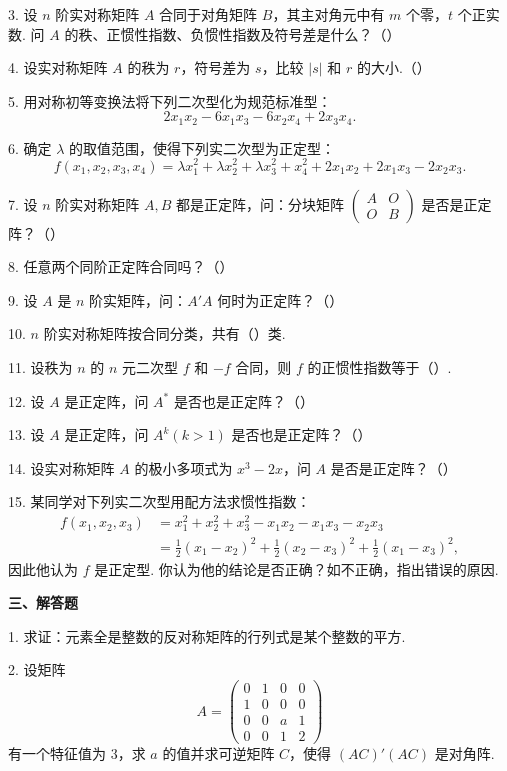 \documentclass[UTF8,12pt,a4paper,fontset=fandol]{ctexart}
\begin{document}
3. 设 $n$ 阶实对称矩阵 $A$ 合同于对角矩阵 $B$，其主对角元中有 $m$ 个零，$t$ 个正实数. 问 $A$ 的秩、正惯性指数、负惯性指数及符号差是什么？（\quad ）

4. 设实对称矩阵 $A$ 的秩为 $r$，符号差为 $s$，比较 $|s|$ 和 $r$ 的大小.（\quad ）

5. 用对称初等变换法将下列二次型化为规范标准型：
\[
2x_1x_2-6x_1x_3-6x_2x_4+2x_3x_4.
\]

6. 确定 $\lambda$ 的取值范围，使得下列实二次型为正定型：
\[
f(x_1,x_2,x_3,x_4)=\lambda x_1^2+\lambda x_2^2+\lambda x_3^2+x_4^2+2x_1x_2+2x_1x_3-2x_2x_3.
\]

7. 设 $n$ 阶实对称矩阵 $A,B$ 都是正定阵，问：分块矩阵 $\left(\begin{array}{cc}A&O\\ O&B\end{array}\right)$ 是否是正定阵？（\quad ）

8. 任意两个同阶正定阵合同吗？（\quad ）

9. 设 $A$ 是 $n$ 阶实矩阵，问：$A'A$ 何时为正定阵？（\quad ）

10. $n$ 阶实对称矩阵按合同分类，共有（\quad ）类.

11. 设秩为 $n$ 的 $n$ 元二次型 $f$ 和 $-f$ 合同，则 $f$ 的正惯性指数等于（\quad ）.

12. 设 $A$ 是正定阵，问 $A^*$ 是否也是正定阵？（\quad ）

13. 设 $A$ 是正定阵，问 $A^k(k>1)$ 是否也是正定阵？（\quad ）

14. 设实对称矩阵 $A$ 的极小多项式为 $x^3-2x$，问 $A$ 是否是正定阵？（\quad ）

15. 某同学对下列实二次型用配方法求惯性指数：
\[
\begin{aligned}
f(x_1,x_2,x_3)&=x_1^2+x_2^2+x_3^2-x_1x_2-x_1x_3-x_2x_3\\
&=\frac12(x_1-x_2)^2+\frac12(x_2-x_3)^2+\frac12(x_1-x_3)^2,
\end{aligned}
\]
因此他认为 $f$ 是正定型. 你认为他的结论是否正确？如不正确，指出错误的原因.

\noindent\textbf{三、解答题}

1. 求证：元素全是整数的反对称矩阵的行列式是某个整数的平方.

2. 设矩阵
\[
A=\left(\begin{array}{cccc}
0 & 1 & 0 & 0\\
1 & 0 & 0 & 0\\
0 & 0 & a & 1\\
0 & 0 & 1 & 2
\end{array}\right)
\]
有一个特征值为 $3$，求 $a$ 的值并求可逆矩阵 $C$，使得 $(AC)'(AC)$ 是对角阵.
\end{document}
